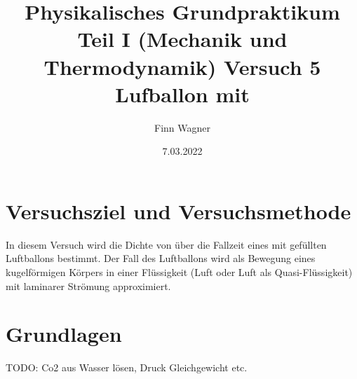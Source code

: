 \documentclass{article}
\date{7.03.2022}
\title{Physikalisches Grundpraktikum Teil I (Mechanik und Thermodynamik) Versuch 5 Lufballon mit \ce{CO2}}
\author{Finn Wagner}
\begin{document}
    \maketitle

    \section{Versuchsziel und Versuchsmethode}
    In diesem Versuch wird die Dichte von  über die Fallzeit eines mit  gefüllten Luftballons bestimmt.
    Der Fall des Luftballons wird als Bewegung eines kugelförmigen Körpers in einer Flüssigkeit (Luft oder Luft als Quasi-Flüssigkeit) mit laminarer Strömung approximiert.

    \section{Grundlagen}
    TODO: Co2 aus Wasser lösen, Druck Gleichgewicht etc.
\end{document}
